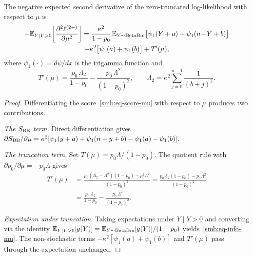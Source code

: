 
\begin{proposition}
\label{smb:prop-info-mu}
  The negative expected second derivative of the zero-truncated
  log-likelihood with respect to $\mu$ is
  \begin{multline}\label{smb:eq-info-mu}
    -\mathbb{E}_{Y|Y>0}\!\left[
      \frac{\partial^2\ell^{(2+)}}{\partial\mu^2}
    \right]
    = \frac{\kappa^2}{1-p_0}\,
      \mathbb{E}_{Y\sim\operatorname{BetaBin}}\bigl[\psi_1(Y+a) + \psi_1(n\!-\!Y+b)\bigr] \\
      - \kappa^2\bigl[\psi_1(a)+\psi_1(b)\bigr]
      + T'(\mu),
  \end{multline}
  where $\psi_1(\cdot) = d\psi/dx$ is the trigamma function and
  \begin{equation}\label{smb:eq-Tprime}
    T'(\mu)
    = \frac{p_0\,\Lambda_2}{1-p_0}
      - \frac{p_0\,\Lambda^2}{(1-p_0)^2},
    \qquad
    \Lambda_2
    = \kappa^2 \sum_{j=0}^{n-1}\frac{1}{(b+j)^2}.
  \end{equation}
\end{proposition}

\begin{proof}
  Differentiating the score~\eqref{smb:eq-score-mu} with respect to
  $\mu$ produces two contributions.

  \medskip\noindent\textit{The $S_{\textup{BB}}$ term.}\enspace
  Direct differentiation gives
  $\partial S_{\textup{BB}}/\partial\mu
  = \kappa^2[\psi_1(y+a) + \psi_1(n-y+b) - \psi_1(a) - \psi_1(b)]$.

  \medskip\noindent\textit{The truncation term.}\enspace
  Set $T(\mu) = p_0\Lambda/(1-p_0)$.  The quotient rule with
  $\partial p_0/\partial\mu = -p_0\Lambda$ gives
  \begin{align*}
    T'(\mu)
    &= \frac{p_0(\Lambda_2 - \Lambda^2)(1-p_0)
             - p_0^2\Lambda^2}{(1-p_0)^2}
    = \frac{p_0\Lambda_2(1-p_0) - p_0\Lambda^2}{(1-p_0)^2} \\
    &= \frac{p_0\,\Lambda_2}{1-p_0}
       - \frac{p_0\,\Lambda^2}{(1-p_0)^2}.
  \end{align*}

  \medskip\noindent\textit{Expectation under truncation.}\enspace
  Taking expectations under $Y \mid Y > 0$ and converting via the
  identity $\mathbb{E}_{Y|Y>0}[g(Y)] = \mathbb{E}_{Y\sim\operatorname{BetaBin}}[g(Y)]/(1-p_0)$
  yields~\eqref{smb:eq-info-mu}.  The non-stochastic terms
  $-\kappa^2[\psi_1(a)+\psi_1(b)]$ and $T'(\mu)$ pass through the
  expectation unchanged.
\end{proof}

